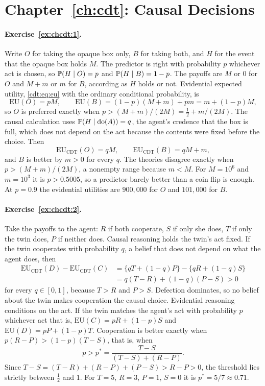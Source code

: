 \section*{Chapter~\ref{ch:cdt}: Causal Decisions}

\paragraph{Exercise~\ref{ex:chcdt:1}.} Write $O$ for taking the opaque box only, $B$ for taking both, and $H$ for the event that the opaque box holds $M$. The predictor is right with probability $p$ whichever act is chosen, so $\mathbb{P}(H\mid O)=p$ and $\mathbb{P}(H\mid B)=1-p$. The payoffs are $M$ or $0$ for $O$ and $M+m$ or $m$ for $B$, according as $H$ holds or not. Evidential expected utility, \eqref{cdt:eq:eu} with the ordinary conditional probability, is
\[
\mathrm{EU}(O) = pM,\qquad \mathrm{EU}(B) = (1-p)(M+m) + pm = m + (1-p)M,
\]
so $O$ is preferred exactly when $p > (M+m)/(2M) = \tfrac12 + m/(2M)$. The causal calculation uses $\mathbb{P}(H\mid\mathrm{do}(A)) = q$, the agent's credence that the box is full, which does not depend on the act because the contents were fixed before the choice. Then
\[
\mathrm{EU}_{\mathrm{CDT}}(O) = qM,\qquad \mathrm{EU}_{\mathrm{CDT}}(B) = qM + m,
\]
and $B$ is better by $m>0$ for every $q$. The theories disagree exactly when $p>(M+m)/(2M)$, a nonempty range because $m<M$. For $M=10^6$ and $m=10^3$ it is $p>0.5005$, so a predictor barely better than a coin flip is enough. At $p=0.9$ the evidential utilities are $900{,}000$ for $O$ and $101{,}000$ for $B$.

\paragraph{Exercise~\ref{ex:chcdt:2}.} Take the payoffs to the agent: $R$ if both cooperate, $S$ if only she does, $T$ if only the twin does, $P$ if neither does. Causal reasoning holds the twin's act fixed. If the twin cooperates with probability $q$, a belief that does not depend on what the agent does, then
\[
\begin{split}
\mathrm{EU}_{\mathrm{CDT}}(D) - \mathrm{EU}_{\mathrm{CDT}}(C) &= \{qT + (1-q)P\} - \{qR + (1-q)S\}\\
&= q(T-R) + (1-q)(P-S) > 0
\end{split}
\]
for every $q\in[0,1]$, because $T>R$ and $P>S$. Defection dominates, so no belief about the twin makes cooperation the causal choice. Evidential reasoning conditions on the act. If the twin matches the agent's act with probability $p$ whichever act that is, $\mathrm{EU}(C) = pR + (1-p)S$ and $\mathrm{EU}(D) = pP + (1-p)T$. Cooperation is better exactly when $p(R-P) > (1-p)(T-S)$, that is, when
\[
p > p^\ast = \frac{T-S}{(T-S) + (R-P)} .
\]
Since $T-S = (T-R) + (R-P) + (P-S) > R-P > 0$, the threshold lies strictly between $\tfrac12$ and $1$. For $T=5$, $R=3$, $P=1$, $S=0$ it is $p^\ast = 5/7 \approx 0.71$.

